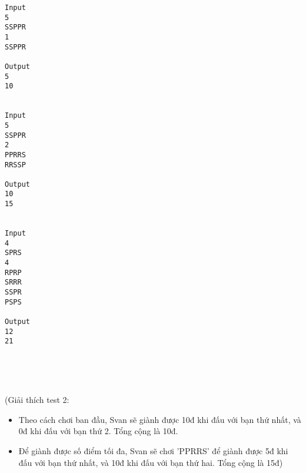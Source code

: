 \begin{verbatim}
Input
5
SSPPR
1
SSPPR

Output
5
10


Input
5
SSPPR
2
PPRRS
RRSSP

Output
10
15


Input
4
SPRS
4
RPRP
SRRR
SSPR
PSPS

Output
12
21
\end{verbatim}

 

 

(Giải thích test 2:
\begin{itemize}
	\item Theo cách chơi ban đầu, Svan sẽ giành được 10đ khi đấu với bạn thứ nhất, và 0đ khi đấu với bạn thứ 2. Tổng cộng là 10đ.
	\item Để giành được số điểm tối đa, Svan sẽ chơi 'PPRRS' để giành được 5đ khi đấu với bạn thứ nhất, và 10đ khi đấu với bạn thứ hai. Tổng cộng là 15đ)
\end{itemize}